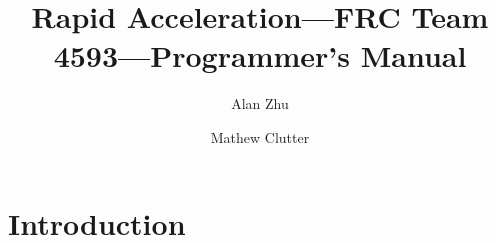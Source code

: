 \documentclass[fleqn,10pt]{olplainarticle}
\title{Rapid Acceleration---FRC Team 4593---Programmer's Manual}
\author[1]{Alan Zhu}
\author[2]{Mathew Clutter}
\affil[1]{alanyzhu@gmail.com}
\affil[2]{mathewclutter@gmail.com}
\begin{document}
\flushbottom
\maketitle
\thispagestyle{empty}

\section*{Introduction}
\end{document}
